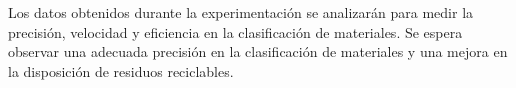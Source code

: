 Los datos obtenidos durante la experimentación se analizarán para medir la precisión, velocidad y eficiencia en la clasificación de materiales. Se espera observar una adecuada precisión en la clasificación de materiales y una mejora en la disposición de residuos reciclables.